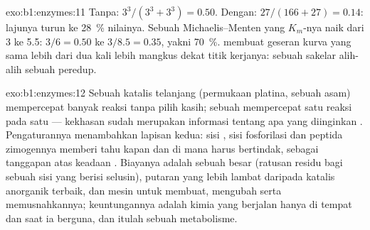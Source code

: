 \begin{solution}{exo:b1:enzymes:11}
Tanpa: $3^3/(3^3 + 3^3) = 0.50$. Dengan: $27/(166 + 27) = 0.14$:
lajunya turun ke \qty{28}{\%} nilainya. Sebuah  Michaelis--Menten
yang $K_m$-nya naik dari 3 ke 5.5: $3/6 = 0.50$ ke $3/8.5 = 0.35$,
yakni \qty{70}{\%}.  membuat geseran kurva yang sama lebih
dari dua kali lebih mangkus dekat titik kerjanya: sebuah sakelar
alih-alih sebuah peredup.
\end{solution}

\begin{solution}{exo:b1:enzymes:12}
Sebuah katalis telanjang (permukaan platina, sebuah asam) mempercepat
banyak reaksi tanpa pilih kasih; sebuah  mempercepat satu reaksi
pada satu  --- kekhasan  sudah merupakan informasi
tentang apa yang diinginkan . Pengaturannya menambahkan lapisan
kedua: sisi , sisi fosforilasi dan peptida zimogennya memberi
tahu  kapan dan di mana harus bertindak, sebagai tanggapan atas
keadaan . Biayanya adalah sebuah  besar (ratusan residu
bagi sebuah sisi yang berisi selusin), putaran yang lebih lambat
daripada katalis anorganik terbaik, dan mesin untuk membuat, mengubah
serta memusnahkannya; keuntungannya adalah kimia yang berjalan hanya di
tempat dan saat ia berguna, dan itulah sebuah metabolisme.
\end{solution}

